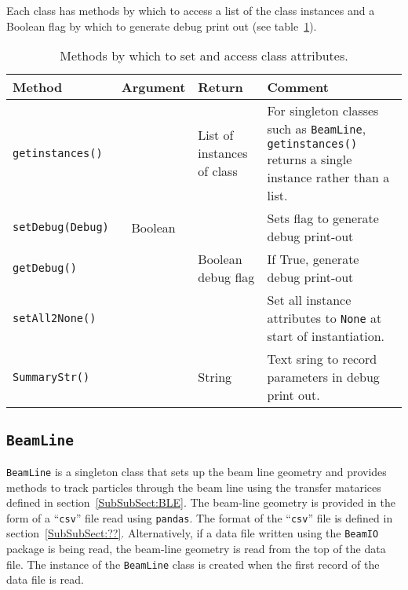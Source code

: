 Each class has methods by which to access a list of the class
instances and a Boolean flag by which to generate debug print out (see
table~\ref{Tab:ClassAttributeAccess}).
\begin{table}[h]
  \caption{Methods by which to set and access class attributes.}
  \label{Tab:ClassAttributeAccess}
  \begin{center}
    \begin{tabular}{|l|c|l|p{7cm}|}
      \hline
      \textbf{Method}          & \textbf{Argument} & \textbf{Return}            & \textbf{Comment}                      \\
      \hline
      \texttt{getinstances()}  &                   & List of instances of class & For singleton classes such as
                                                                                  \texttt{BeamLine}, \texttt{getinstances()}
                                                                                  returns a single instance rather than a list. \\
      \texttt{setDebug(Debug)} & Boolean           &                            & Sets flag to generate debug print-out \\
      \texttt{getDebug()}      &                   & Boolean debug flag         & If True, generate debug print-out     \\
      \texttt{setAll2None()}   &                   &                            & Set all instance attributes to
                                                                                  \texttt{None} at start of instantiation. \\
      \texttt{SummaryStr()}    &                   & String                     & Text sring to record parameters in debug
                                                                                  print out. \\
      \hline
    \end{tabular}
  \end{center}
\end{table}

\pagebreak

\subsection{\texttt{BeamLine}}

\texttt{BeamLine} is a singleton class that sets up the beam line
geometry and provides methods to track particles through the beam line
using the transfer matarices defined in section~\ref{SubSubSect:BLE}.
The beam-line geometry is provided in the form of a ``\texttt{csv}''
file read using \texttt{pandas}.
The format of the ``\texttt{csv}'' file is defined in
section~\ref{SubSubSect:??}.
Alternatively, if a data file written using the \texttt{BeamIO}
package is being read, the beam-line geometry is read from the top of
the data file.
The instance of the \texttt{BeamLine} class is created when the first
record of the data file is read.

